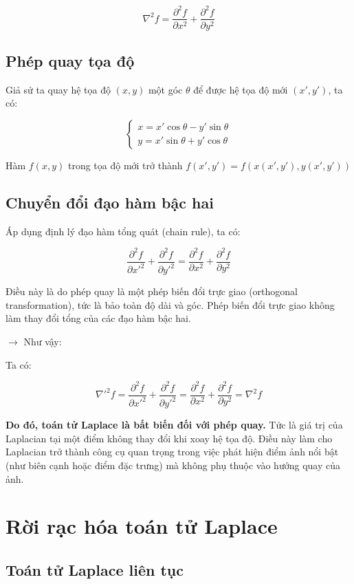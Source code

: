 \documentclass[12pt]{article}
\begin{document}
	\[
	\nabla^2 f = \frac{\partial^2 f}{\partial x^2} + \frac{\partial^2 f}{\partial y^2}
	\]
	
	\subsection{Phép quay tọa độ}
	
	Giả sử ta quay hệ tọa độ $(x, y)$ một góc $\theta$ để được hệ tọa độ mới $(x', y')$, ta có:
	
	\[
	\begin{cases}
	x = x' \cos\theta - y' \sin\theta \\
	y = x' \sin\theta + y' \cos\theta
	\end{cases}
	\]
	
	Hàm $f(x, y)$ trong tọa độ mới trở thành $f(x', y') = f(x(x', y'), y(x', y'))$
	
	\subsection{Chuyển đổi đạo hàm bậc hai}
	
	Áp dụng định lý đạo hàm tổng quát (chain rule), ta có:
	
	\[
	\frac{\partial^2 f}{\partial x'^2} + \frac{\partial^2 f}{\partial y'^2} = \frac{\partial^2 f}{\partial x^2} + \frac{\partial^2 f}{\partial y^2}
	\]
	
	Điều này là do phép quay là một phép biến đổi trực giao (orthogonal transformation), tức là bảo toàn độ dài và góc. Phép biến đổi trực giao không làm thay đổi tổng của các đạo hàm bậc hai.
	
	$\rightarrow$ Như vậy:
	
	Ta có:
	
	\[
	\nabla'^2 f = \frac{\partial^2 f}{\partial x'^2} + \frac{\partial^2 f}{\partial y'^2} = \frac{\partial^2 f}{\partial x^2} + \frac{\partial^2 f}{\partial y^2} = \nabla^2 f
	\]
	
	\textbf{Do đó, toán tử Laplace là bất biến đối với phép quay.} Tức là giá trị của Laplacian tại một điểm không thay đổi khi xoay hệ tọa độ. Điều này làm cho Laplacian trở thành công cụ quan trọng trong việc phát hiện điểm ảnh nổi bật (như biên cạnh hoặc điểm đặc trưng) mà không phụ thuộc vào hướng quay của ảnh.
	
	\section{Rời rạc hóa toán tử Laplace}
	
	\subsection{Toán tử Laplace liên tục}
	
\end{document}

